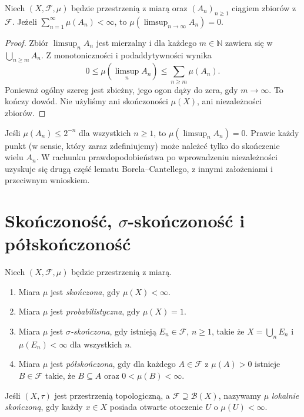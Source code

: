 \begin{twierdzenie}
\label{thm:borel-cantelli-1}
Niech $(X,\mathcal F,\mu)$ będzie przestrzenią z miarą
oraz $(A_n)_{n\geq1}$ ciągiem zbiorów z $\mathcal F$.
Jeżeli $\sum_{n=1}^{\infty}\mu(A_n)<\infty$, to
$\mu(\limsup_{n\to\infty}A_n)=0$.
\end{twierdzenie}
\begin{proof}
Zbiór $\limsup_nA_n$ jest mierzalny i dla każdego
$m\in\mathbb N$ zawiera się w $\bigcup_{n\geq m}A_n$.
Z monotoniczności i podaddytywności wynika
\[
0\leq\mu(\limsup_nA_n)
\leq\sum_{n\geq m}\mu(A_n).
\]
Ponieważ ogólny szereg jest zbieżny, jego ogon dąży do zera,
gdy $m\to\infty$. To kończy dowód. Nie użyliśmy ani
skończoności $\mu(X)$, ani niezależności zbiorów.
\end{proof}

\begin{przyklad}[Interpretacja]
Jeśli $\mu(A_n)\leq2^{-n}$ dla wszystkich $n\geq1$, to
$\mu(\limsup_nA_n)=0$. Prawie każdy punkt (w sensie, który
zaraz zdefiniujemy) może należeć tylko do skończenie wielu $A_n$.
W rachunku prawdopodobieństwa po wprowadzeniu niezależności
uzyskuje się drugą część lematu Borela--Cantellego, z innymi
założeniami i przeciwnym wnioskiem.
\end{przyklad}

\section{Skończoność, \texorpdfstring{$\sigma$}{sigma}-skończoność i półskończoność}

\begin{definicja}
\label{def:measure-finiteness}
Niech $(X,\mathcal F,\mu)$ będzie przestrzenią z miarą.
\begin{enumerate}
\item Miara $\mu$ jest \emph{skończona}, gdy $\mu(X)<\infty$.
\item Miara $\mu$ jest \emph{probabilistyczna}, gdy $\mu(X)=1$.
\item Miara $\mu$ jest \emph{$\sigma$-skończona}, gdy istnieją
$E_n\in\mathcal F$, $n\geq1$, takie że
$X=\bigcup_nE_n$ i $\mu(E_n)<\infty$ dla wszystkich $n$.
\item Miara $\mu$ jest \emph{półskończona}, gdy dla każdego
$A\in\mathcal F$ z $\mu(A)>0$ istnieje $B\in\mathcal F$
takie, że $B\subseteq A$ oraz $0<\mu(B)<\infty$.
\end{enumerate}
Jeśli $(X,\tau)$ jest przestrzenią topologiczną, a
$\mathcal F\supseteq\mathcal B(X)$, nazywamy $\mu$
\emph{lokalnie skończoną}, gdy każdy $x\in X$ posiada
otwarte otoczenie $U$ o $\mu(U)<\infty$.
\end{definicja}

